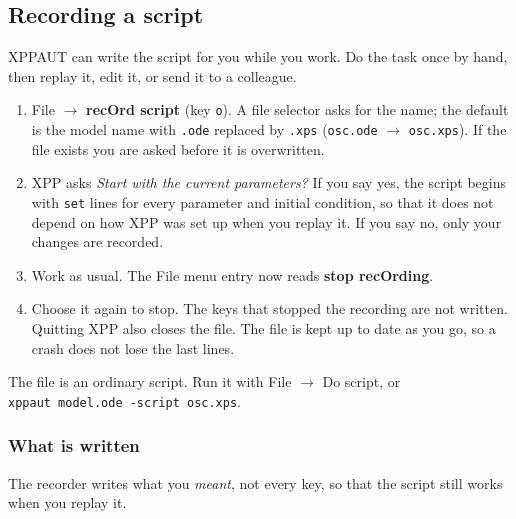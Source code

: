 \documentclass{article}
\providecommand{\tightlist}{\setlength{\itemsep}{0pt}\setlength{\parskip}{0pt}}
\begin{document}
\subsection{Recording a script}\label{scr:11}

XPPAUT can write the script for you while you work. Do the task once
by hand, then replay it, edit it, or send it to a colleague.

\begin{enumerate}
\def\labelenumi{\arabic{enumi}.}
\tightlist
\item
  File $\rightarrow$ \textbf{recOrd script} (key \texttt{o}). A file
  selector asks for the name; the default is the model name with
  \texttt{.ode} replaced by \texttt{.xps} (\texttt{osc.ode} $\rightarrow$
  \texttt{osc.xps}). If the file exists you are asked before it is
  overwritten.
\item
  XPP asks \emph{Start with the current parameters?} If you say yes,
  the script begins with \texttt{set} lines for every parameter and
  initial condition, so that it does not depend on how XPP was set up when
  you replay it. If you say no, only your changes are recorded.
\item
  Work as usual. The File menu entry now reads \textbf{stop
  recOrding}.
\item
  Choose it again to stop. The keys that stopped the recording are not
  written. Quitting XPP also closes the file. The file is kept up to date
  as you go, so a crash does not lose the last lines.
\end{enumerate}

The file is an ordinary script. Run it with File $\rightarrow$ Do script, or
\texttt{xppaut\ model.ode\ -script\ osc.xps}.

\subsubsection{What is written}

The recorder writes what you \emph{meant}, not every key, so that
the script still works when you replay it.
\end{document}
